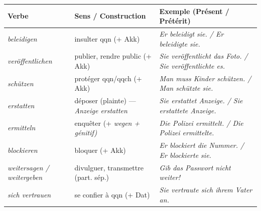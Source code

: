 \documentclass[11pt]{article}
\newcommand{\all}[1]{\ifmmode\text{\textit{#1}}\else\begingroup\selectlanguage{ngerman}\itshape #1\endgroup\fi}
\begin{document}
\begin{propriete}
\begin{center}
\begin{tabularx}{\linewidth}{|X|X|X|}
\hline
\rowcolor{popblueL} \textbf{Verbe} & \textbf{Sens / Construction} & \textbf{Exemple (Présent / Prétérit)} \\
\hline
\all{beleidigen} & insulter qqn (+ Akk) & \all{Er beleidigt sie. / Er beleidigte sie.} \\
\all{veröffentlichen} & publier, rendre public (+ Akk) & \all{Sie veröffentlicht das Foto. / Sie veröffentlichte es.} \\
\all{schützen} & protéger qqn/qqch (+ Akk) & \all{Man muss Kinder schützen. / Man schützte sie.} \\
\all{erstatten} & déposer (plainte) — \all{Anzeige erstatten} & \all{Sie erstattet Anzeige. / Sie erstattete Anzeige.} \\
\all{ermitteln} & enquêter (+ \all{wegen} + génitif) & \all{Die Polizei ermittelt. / Die Polizei ermittelte.} \\
\all{blockieren} & bloquer (+ Akk) & \all{Er blockiert die Nummer. / Er blockierte sie.} \\
\all{weitersagen / weitergeben} & divulguer, transmettre (part. sép.) & \all{Gib das Passwort nicht weiter!} \\
\all{sich vertrauen} & se confier à qqn (+ Dat) & \all{Sie vertraute sich ihrem Vater an.} \\
\hline
\end{tabularx}
\end{center}
\end{propriete}
\end{document}

